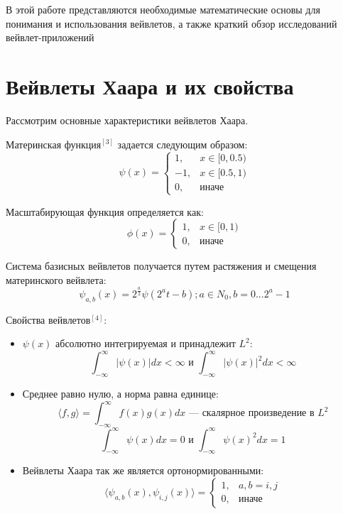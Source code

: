 \documentclass[a4paper]{article}
\begin{document}
	В этой работе представляются необходимые математические основы для понимания и использования вейвлетов, а также краткий обзор исследований вейвлет-приложений
	
	\newpage
	
	\section{Вейвлеты Хаара и их свойства}
	Рассмотрим основные характеристики вейвлетов Хаара.
	
	Материнская функция$^{[3]}$ задается следующим образом: 
	$$
		\psi(x) = 
		\begin{cases}
			 1, & x \in [0, 0.5) \\
			-1, & x \in [0.5, 1) \\
			 0, & \text{иначе}
		\end{cases}
	$$
		
	Масштабирующая функция определяется как:
	$$
		\phi(x) =
		\begin{cases}
			1, & x \in [0, 1) \\
			0, & \text{иначе}
		\end{cases}
	$$
	
	Система базисных вейвлетов получается путем растяжения и смещения материнского вейвлета:
	$$ 
		\psi_{a, b}(x) = 2^{\frac{a}{2}}\psi(2^at-b);
		a \in N_0, b = 0...2^a-1
	$$
	
	Свойства вейвлетов$^{[4]}$:
	
	\begin{itemize}
		\item $\psi(x)$ абсолютно интегрируемая и принадлежит $L^2$:
		$$
			\int_{-\infty}^{\infty} |\psi(x)|dx < \infty 
			\text{ и }
			\int_{-\infty}^{\infty} |\psi(x)|^2dx < \infty 
		$$
		\item Среднее равно нулю, а норма равна единице:
		$$
			\langle f, g \rangle = \int_{-\infty}^{\infty} f(x)g(x)dx
			\text{ --- скалярное произведение в }L^2
		$$ 
		$$
			\int_{-\infty}^{\infty} \psi(x)dx = 0 
			\text{ и }
			\int_{-\infty}^{\infty} \psi(x)^2dx = 1
		$$
		\item Вейвлеты Хаара так же является ортонормированными:
		$$
			\langle
				\psi_{a, b}(x),
				\psi_{i, j}(x)
			\rangle = 
			\begin{cases}
				1, & a, b = i, j \\
				0, & \text{иначе} 
			\end{cases}
		$$
	\end{itemize}
	
	\newpage
	
\end{document}
